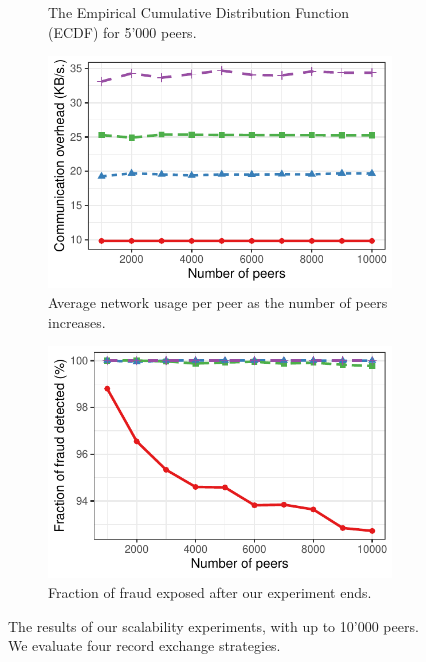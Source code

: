 \begin{figure}[t]
\begin{subfigure}{.5\columnwidth}
		\caption{The Empirical Cumulative Distribution Function (ECDF) for 5'000 peers.}
		\label{fig:experiment_scalability_ecdf_detection_times}
	\end{subfigure}
	\begin{subfigure}{.5\columnwidth}
		\centering
		\captionsetup{width=.9\linewidth}
		\includegraphics[width=\linewidth]{trustchain/assets/scalability_bandwidth_usage}
		\caption{Average network usage per peer as the number of peers increases.}
		\label{fig:experiment_scalability_bandwidth}
	\end{subfigure}%
	\begin{subfigure}{.5\columnwidth}
		\centering
		\captionsetup{width=.9\linewidth}
		\includegraphics[width=\columnwidth]{trustchain/assets/scalability_num_detected}
		\caption{Fraction of fraud exposed after our experiment ends.}
		\label{fig:experiment_scalability_num_detected}
	\end{subfigure}
	\caption{The results of our scalability experiments, with up to 10'000 peers. We evaluate four record exchange strategies.}
	\label{fig:scalability_experiments}
\end{figure}

